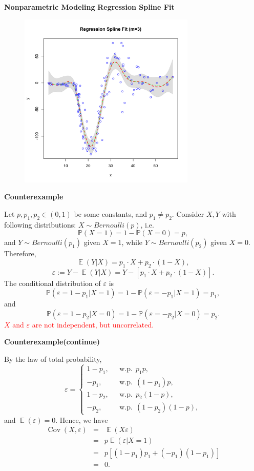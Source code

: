\documentclass[19pt,landscaoe]{article}
\newcommand{\IP}{\mathbb{P}}
\DeclareMathOperator{\E}{\mathbb{E}}
\DeclareMathOperator{\cov}{\mathrm{Cov}}
\begin{document}
\newpage
{\LARGE{\textbf{Nonparametric Modeling}}}
\vskip25pt
{\Large\bf{Regression Spline Fit}}

\begin{figure}[h]
\centering
      \includegraphics[width=0.75\textwidth,height=0.52\textwidth]{splinefit.pdf}
    \label{figure4} 

\end{figure}
\newpage
{\LARGE\centerline{\textbf{Counterexample}}}
\vskip25pt
\begin{minipage}{.9\textwidth}
    \Large 
    Let $p,p_1,p_2\in(0,1)$ be some constants, and $p_1\ne p_2$. Consider $X,Y$ with following distributions: 
$X\sim Bernoulli(p)$, i.e. 
$$\IP(X=1)=1-\IP(X=0)=p,$$
and $Y\sim Bernoulli(p_1)$ given $X=1$, while $Y\sim Bernoulli(p_2)$ given $X=0$. Therefore, 
$$\E(Y|X)=p_1\cdot X+p_2\cdot(1-X),$$
$$\varepsilon:=Y-\E(Y|X)=Y-[p_1\cdot X+p_2\cdot(1-X)].$$
The conditional distribution of $\varepsilon$ is
$$\IP(\varepsilon=1-p_1|X=1)=1-\IP(\varepsilon=-p_1|X=1)=p_1,$$
and  
$$\IP(\varepsilon=1-p_2|X=0)=1-\IP(\varepsilon=-p_2|X=0)=p_2.$$
\textcolor{red}{$X$ and $\varepsilon$ are not independent, but uncorrelated.}
\end{minipage}

\newpage
{\LARGE\centerline{\textbf{Counterexample(continue)}}}
\vskip25pt
\begin{minipage}{.9\textwidth}
    \Large 
    By the law of total probability, 
    \begin{equation*}
        \varepsilon=\begin{cases}
            1-p_1,~~~&\mathrm{w.p.}~~p_1p,\\
            -p_1,~~~&\mathrm{w.p.}~~(1-p_1)p,\\
            1-p_2,~~~&\mathrm{w.p.}~~p_2(1-p),\\
            -p_2,~~~&\mathrm{w.p.}~~(1-p_2)(1-p),
        \end{cases}
    \end{equation*}
 and  $\E(\varepsilon)=0$. Hence, we have 
   \begin{eqnarray*}
    \cov(X,\varepsilon)&=&\E(X\varepsilon)\\
    &=&p\E(\varepsilon|X=1)\\
    &=&p[(1-p_1)p_1+(-p_1)(1-p_1)]\\
    &=&0.
   \end{eqnarray*}
\end{minipage}
\end{document}

